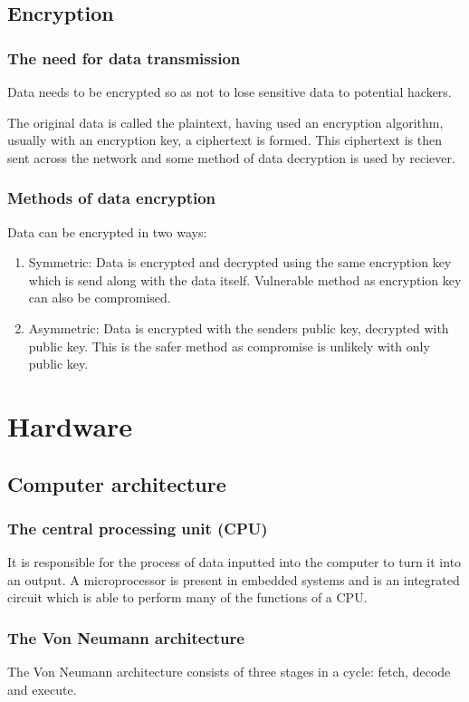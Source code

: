 \documentclass{article}
\begin{document}
\subsection{Encryption}
\subsubsection{The need for data transmission}
Data needs to be encrypted so as not to lose sensitive data to potential hackers.

The original data is called the plaintext, having used an encryption algorithm, usually
with an encryption key, a ciphertext is formed. This ciphertext is then sent across the
network and some method of data decryption is used by reciever.

\subsubsection{Methods of data encryption}
Data can be encrypted in two ways:
\begin{enumerate}
	\item Symmetric: Data is encrypted and decrypted using the same encryption key which is 
		send along with the data itself. Vulnerable method as encryption key can also be 
		compromised.
	\item Asymmetric: Data is encrypted with the senders public key, decrypted with 
		public key. This is the safer method as compromise is unlikely with only public
		key.
\end{enumerate}

\section{Hardware}
\subsection{Computer architecture}
\subsubsection{The central processing unit (CPU)}
It is responsible for the process of data inputted into the computer to turn it into an
output. A microprocessor is present in embedded systems and is an integrated circuit 
which is able to perform many of the functions of a CPU.

\subsubsection{The Von Neumann architecture}
The Von Neumann architecture consists of three stages in a cycle: fetch, decode and 
execute.
\end{document}

